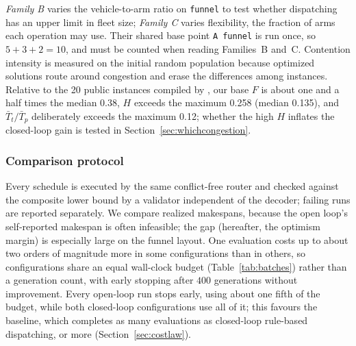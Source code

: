 \documentclass[preprint,review,12pt,authoryear]{elsarticle}
\newcommand{\NCases}{10}
\newcommand{\PubFMed}{0.38}              %
\newcommand{\PubHMed}{0.135}             %
\newcommand{\PubHMax}{0.258}             %
\newcommand{\PubTtTpHi}{0.12}            %
\newcommand{\PubNInst}{20}
\begin{document}
\emph{Family B} varies the vehicle-to-arm ratio on \texttt{funnel} to test whether dispatching has an upper limit in fleet size; \emph{Family C} varies flexibility, the fraction of arms each operation may use.
Their shared base point \texttt{A funnel} is run once, so $5+3+2=\NCases$, and must be counted when reading Families~B and~C.
Contention intensity is measured on the initial random population because optimized solutions route around congestion and erase the differences among instances.
Relative to the \PubNInst{} public instances compiled by \citet{homayouni2021production}, our base $F$ is about one and a half times the median \PubFMed{}, $H$ exceeds the maximum \PubHMax{} (median \PubHMed{}), and $\bar{T}_t/\bar{T}_p$ deliberately exceeds the maximum \PubTtTpHi{}; whether the high $H$ inflates the closed-loop gain is tested in Section~\ref{sec:whichcongestion}.

\begin{table}[!htbp]
\caption{Controlled instances. Shared core: $12$ jobs, $36$ real operations, $8$ arms, $H=0.3$, $\bar{T}_t/\bar{T}_p\approx4.0$.
Contention intensity: share of yielding wait in travel time on the initial random population.}
\label{tab:instances}
\small

\end{table}

\subsubsection{Comparison protocol}
\label{sec:protocol}

Every schedule is executed by the same conflict-free router and checked against the composite lower bound by a validator independent of the decoder; failing runs are reported separately.
We compare realized makespans, because the open loop's self-reported makespan is often infeasible; the gap (hereafter, the optimism margin) is especially large on the funnel layout.
One evaluation costs up to about two orders of magnitude more in some configurations than in others, so configurations share an equal wall-clock budget (Table~\ref{tab:batches}) rather than a generation count, with early stopping after $400$ generations without improvement.
Every open-loop run stops early, using about one fifth of the budget, while both closed-loop configurations use all of it; this favours the baseline, which completes as many evaluations as closed-loop rule-based dispatching, or more (Section~\ref{sec:costlaw}).
\end{document}
